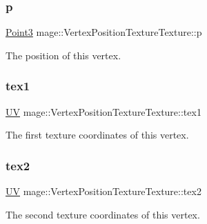 \subsubsection{\texorpdfstring{p}{p}}
{\footnotesize\ttfamily \hyperlink{structmage_1_1_point3}{Point3} mage\+::\+Vertex\+Position\+Texture\+Texture\+::p}

The position of this vertex. \hypertarget{structmage_1_1_vertex_position_texture_texture_a96be20a1f6ec9b9b74875099eef80f08}{}\label{structmage_1_1_vertex_position_texture_texture_a96be20a1f6ec9b9b74875099eef80f08} 
\subsubsection{\texorpdfstring{tex1}{tex1}}
{\footnotesize\ttfamily \hyperlink{structmage_1_1_u_v}{UV} mage\+::\+Vertex\+Position\+Texture\+Texture\+::tex1}

The first texture coordinates of this vertex. \hypertarget{structmage_1_1_vertex_position_texture_texture_a5a41669f18385d932c1490ff20c80bed}{}\label{structmage_1_1_vertex_position_texture_texture_a5a41669f18385d932c1490ff20c80bed} 
\subsubsection{\texorpdfstring{tex2}{tex2}}
{\footnotesize\ttfamily \hyperlink{structmage_1_1_u_v}{UV} mage\+::\+Vertex\+Position\+Texture\+Texture\+::tex2}

The second texture coordinates of this vertex. 